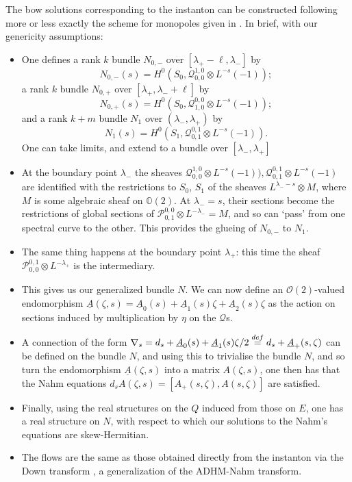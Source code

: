 \documentclass[12pt]{article}
\theoremstyle{definition}
\theoremstyle{remark}
\numberwithin{theorem}{section}
\def\bO{{\mathbb {O}}}
\def\pO{{\mathcal O}}
\def\pP{{\mathcal P}}
\def\pQ{{\mathcal Q}}
\begin{document}
The bow solutions corresponding to the instanton can be constructed following more or less exactly the scheme for monopoles given in \cite[Section 2]{HurtubiseMurray}. In brief, with our genericity assumptions:
\begin{itemize}
\item One defines a rank $k$ bundle $N_{0,-}$ over  $[\lambda_+-\ell, \lambda_-  ]$ by  
$$N_{0,-}(s) = H^0(S_0, \pQ_{0,0}^{1,0}\otimes L^{-s}(-1));$$ 
a rank $k$ bundle $N_{0,+}$ over $[\lambda_+, \lambda_- +\ell]$ by 
$$N_{0,+}(s) = H^0(S_0, \pQ_{1,0}^{0,0}\otimes L^{-s}(-1));$$ 
and a rank $k+m$ bundle $N_1$ over $(\lambda_-, \lambda_+)$ by 
$$N_1(s) = H^0(S_1, \pQ_{0,1}^{0,1}\otimes L^{-s}(-1)).$$
One can take limits, and extend to a bundle over $[\lambda_-, \lambda_+]$
\item At the boundary point $\lambda_-$  the sheaves $\pQ_{0,0}^{1,0}\otimes L^{-s}(-1)), \pQ_{0,1}^{0,1}\otimes L^{-s}(-1)$ are identified with the restrictions to $S_0$, $S_1$ of the sheaves $L^{\lambda_--s}\otimes M$, where $M$ is some algebraic sheaf on $\bO(2)$. At $\lambda_-=s$, their sections become the restrictions of global sections of $\pP_{0 ,1}^{0 ,0}\otimes L^{-\lambda_-} = M$, and so can `pass' from one spectral curve to the other. This provides the glueing of $N_{0,-}$ to $N_1$.
\item The same thing happens at the boundary point $\lambda_+$:  this time the sheaf $\pP^{0 ,1}_{0 ,0}\otimes L^{-\lambda_+}$
is the intermediary.
\item This gives us our generalized bundle $N.$ We can now define an {$\pO(2)$-valued} endomorphism $\underline A(\zeta,s) =\underline A_0(s) + \underline A_1(s)\zeta + \underline A_2(s)\zeta$   as the action on sections induced by multiplication by $\eta$ on the $\pQ$s. 
\item A connection of the form $\nabla_s =  d_s + \underline A_0(s) + \underline A_1(s)\zeta/2 \buildrel{def}\over{=} d_s + \underline A_+(s,\zeta)$ can be defined on the bundle $N$, and using this to trivialise the bundle $N$, and so turn the endomorphism  $\underline A(\zeta,s) $ into a matrix  $ A(\zeta,s)$,   one then has that the Nahm equations $d_sA(\zeta,s) = [A_+(s,\zeta), A(s,\zeta)]$ are satisfied.
\item Finally, using the real structures on the $Q$ induced from those on $E$, one has a real structure on $N$, with respect to which our solutions to the Nahm's equations are skew-Hermitian.
\item The flows are the same as those obtained directly from the instanton via the Down transform \cite{Third}, a generalization of the ADHM-Nahm transform.
\end{itemize}
\end{document}
